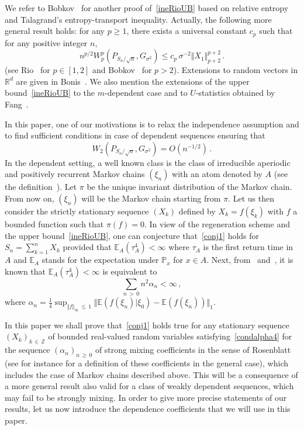 \documentclass[AHL,Unicode,longabstracts,published]{cedram}
\newcommand{\bbE}{\mathbb{E}}
\newcommand{\bbZ}{\mathbb{Z}}
\newcommand{\bbP}{\mathbb{P}}
\newcommand{\bbR}{\mathbb{R}}
\begin{document}
We refer to Bobkov~\cite{Bob13} for another proof of~\eqref{ineRioUB} based on relative entropy and Talagrand's entropy-transport inequality. Actually, the following more general result holds: for any $p \geq 1$, there exists a universal constant $c_p$ such that for any positive integer $n$,
\[
n^{p/2} W_p^p \left(P_{S_n / \sqrt n}, G_{\sigma^2}\right) \leq c_p \, \sigma^{-2} \Vert X_1 \Vert_{p+2}^{p+2} \,.
\]
(see Rio~\cite{Rio09} for $p \in [1,2]$ and Bobkov~\cite{Bob18} for $p>2$). Extensions to random vectors in $\bbR^d$ are given in Bonis~\cite{Bo20}. We also mention the extensions of the upper bound~\eqref{ineRioUB} to the $m$-dependent case and to $U$-statistics obtained by Fang~\cite{Fa19}.

In this paper, one of our motivations is to relax the independence assumption and to find sufficient conditions in case of dependent sequences ensuring that
\begin{equation}\label{conj1}
W_2 \left(P_{S_n / \sqrt n }, G_{\sigma^2}\right) = O (n^{-1/2}) \,.
\end{equation}
In the dependent setting, a well known class is the class of irreducible aperiodic and positively recurrent Markov chains $(\xi_n)$ with an atom denoted by $A$ (see the definition~\cite[p.~286]{Bo82}). Let $\pi $ be the unique invariant distribution of the Markov chain. From now on, $(\xi_n)$ will be the Markov chain starting from $\pi$. Let us then consider the strictly stationary sequence $(X_k) $ defined by $X_k =f (\xi_k)$ with $f$ a bounded function such that $\pi(f) =0$. In view of the regeneration scheme and the upper bound~\eqref{ineRioUB}, one can conjecture that~\eqref{conj1} holds for $S_n = \sum_{k=1}^n X_k$ provided that $\bbE_A (\tau_A^4) < \infty$ where $\tau_A$ is the first return time in $A$ and $\bbE_A$ stands for the expectation under $\bbP_x$ for $x \in A$. Next, from~\cite[Lemma~3]{Bo82} and~\cite[p.~165]{Rio17}, it is known that $\bbE_A (\tau_A^4) < \infty$ is equivalent to
\begin{equation}\label{condalpha4}
\sum_{n\,>\,0} n^{2} \alpha_n < \infty \,,
\end{equation}
where $
\alpha_n = { \textstyle \frac{1}{4} } \sup_{\Vert f \Vert_{\infty}\,\leq\,1} \Vert \bbE (f(\xi_n) | \xi_0) - \bbE (f (\xi_n)) \Vert_1 $.

In this paper we shall prove that~\eqref{conj1} holds true for any stationary sequence $(X_k)_{k \,\in\,\bbZ}$ of bounded real-valued random variables satisfying~\eqref{condalpha4} for the sequence $(\alpha_n)_{n\,\geq\,0}$ of strong mixing coefficients in the sense of Rosenblatt (see for instance \cite[Section~5.1.1.]{MPU} for a definition of these coefficients in the general case), which includes the case of Markov chains described above. This will be a consequence of a more general result also valid for a class of weakly dependent sequences, which may fail to be strongly mixing. In order to give more precise statements of our results, let us now introduce the dependence coefficients that we will use in this paper.
\end{document}
